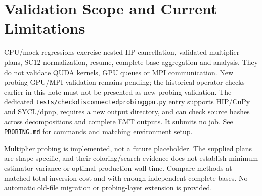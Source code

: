 \documentclass[11pt,a4paper]{article}
\newcommand{\code}[1]{\texttt{\begingroup\def\_{\textunderscore\allowbreak}#1\endgroup}}
\begin{document}
\section{Validation Scope and Current Limitations}

CPU/mock regressions exercise nested HP cancellation, validated multiplier
plans, SC12 normalization, resume, complete-base aggregation and analysis.
They do not validate QUDA kernels, GPU queues or MPI communication. New probing
GPU/MPI validation remains pending; the historical operator checks earlier in
this note must not be presented as new probing validation.
The dedicated \code{tests/check\_disconnected\_probing\_gpu.py} entry supports
HIP/CuPy and SYCL/dpnp, requires a new output directory, and can check source
hashes across decompositions and complete EMT outputs. It submits no job.
See \code{PROBING.md} for commands and matching environment setup.

Multiplier probing is implemented, not a future placeholder. The supplied
plans are shape-specific, and their coloring/search evidence does not establish
minimum estimator variance or optimal production wall time. Compare methods
at matched total inversion cost and with enough independent complete bases.
No automatic old-file migration or probing-layer extension is provided.
\end{document}
